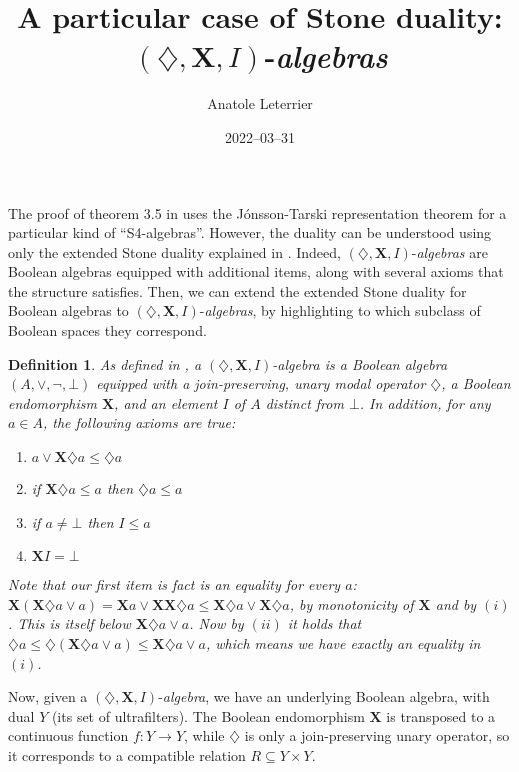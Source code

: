 \documentclass[11pt]{article}
\title{A particular case of Stone duality: $(\diamondsuit,\mathbf{X},I)$-\emph{algebras}}
\author{Anatole Leterrier}
\date{2022–03–31}
\newtheorem{definition}{Definition}
\begin{document}
\maketitle
The proof of theorem 3.5 in \cite{GhivG17} uses the J\'onsson-Tarski representation theorem for a particular kind of ``S4-algebras''.
However, the duality can be understood using only the extended Stone duality explained in \cite{GehvG22}. Indeed, $(\diamondsuit,\mathbf{X},I)$-\emph{algebras}
are Boolean algebras equipped with additional items, along with several axioms that the structure satisfies.
Then, we can extend the extended Stone duality for Boolean algebras to $(\diamondsuit,\mathbf{X},I)$-\emph{algebras},
by highlighting to which subclass of Boolean spaces they correspond.

\begin{definition}\label{diamXIalgebra}
As defined in \cite{GhivG17}, a $(\diamondsuit,\mathbf{X},I)$-\emph{algebra} is a Boolean algebra $(A,\lor,\neg,\bot)$ equipped with a join-preserving, unary modal operator $\diamondsuit$,
a Boolean endomorphism $\mathbf{X}$, and an element $I$ of $A$ distinct from $\bot$.
In addition, for any $a \in A$, the following axioms are true:
\begin{enumerate}[label=(\roman*)]
    \item $a \lor \mathbf{X}\diamondsuit a \leq \diamondsuit a$
    \item if $\mathbf{X}\diamondsuit a \leq a$ then $\diamondsuit a \leq a$
    \item if $a \ne \bot$ then $I \leq a$
    \item $\mathbf{X}I = \bot$
\end{enumerate}
Note that our first item is fact is an equality for every $a$:
$\mathbf{X}(\mathbf{X}\diamondsuit a \lor a) = \mathbf{X}a \lor \mathbf{X}\mathbf{X}\diamondsuit a \leq \mathbf{X}\diamondsuit a \lor \mathbf{X}\diamondsuit a$, by monotonicity of $\mathbf{X}$ and by $(i)$.
This is itself below $\mathbf{X}\diamondsuit a \lor a$. Now by $(ii)$ it holds that $\diamondsuit a \leq \diamondsuit (\mathbf{X}\diamondsuit a \lor a)\leq \mathbf{X}\diamondsuit a \lor a$, which means we have exactly an equality in $(i)$.
\end{definition}

Now, given a $(\diamondsuit,\mathbf{X},I)$-\emph{algebra}, we have an underlying Boolean algebra, with dual $Y$ (its set of ultrafilters).
The Boolean endomorphism $\mathbf{X}$ is transposed to a continuous function $f\colon Y \to Y$, while $\diamondsuit$ is only a join-preserving
unary operator, so it corresponds to a compatible relation $R \subseteq Y\times Y$. 
\end{document}
